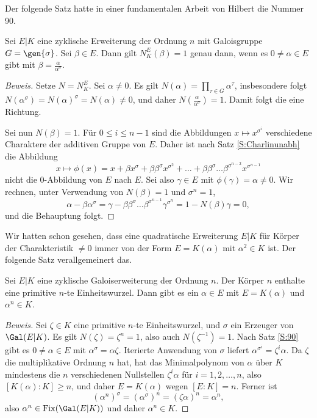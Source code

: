 \documentclass[12pt,a4paper,twoside]{article}
\DeclareMathOperator{\Fix}{Fix}
\begin{document}
Der folgende Satz hatte in einer fundamentalen Arbeit von Hilbert die Nummer
90.
\begin{Satz}\label{S:90}
  Sei $E|K$ eine zyklische Erweiterung der Ordnung $n$ mit Galoisgruppe
  $G=\gen{\sigma}$. Sei $\beta\in E$. Dann gilt $N_K^E(\beta)=1$ genau dann,
  wenn es $0\ne\alpha\in E$ gibt mit $\beta=\frac{\alpha}{\alpha^\sigma}$.
\end{Satz}
\begin{proof}[Beweis]
  Setze $N=N_K^E$. Sei $\alpha\ne0$. Es gilt $N(\alpha)=\prod_{\tau\in
    G}\alpha^\tau$, insbesondere folgt
  $N(\alpha^\sigma)=N(\alpha)^\sigma=N(\alpha)\ne0$, und daher
  $N(\frac{\alpha}{\alpha^\sigma})=1$. Damit folgt die eine Richtung.

Sei nun $N(\beta)=1$. F\"ur $0\le i\le n-1$ sind die Abbildungen $x\mapsto
x^{\sigma^i}$ verschiedene Charaktere der additiven Gruppe von $E$. Daher ist
nach Satz \ref{S:Charlinunabh} die Abbildung
\[
x\mapsto \phi(x)=x+\beta x^\sigma+\beta\beta^\sigma x^{\sigma^2}+\dots
+\beta\beta^\sigma\dots\beta^{\sigma^{n-2}}x^{\sigma^{n-1}}
\]
nicht die $0$-Abbildung von $E$ nach $E$. Sei also $\gamma\in E$ mit
$\phi(\gamma)=\alpha\ne0$. Wir rechnen, unter Verwendung von $N(\beta)=1$ und
$\sigma^n=1$,
\[
\alpha-\beta\alpha^\sigma=
\gamma-\beta\beta^\sigma\dots\beta^{\sigma^{n-1}}\gamma^{\sigma^{n}}=
1-N(\beta)\gamma=0,
\]
und die Behauptung folgt.

\end{proof}
Wir hatten schon gesehen, dass eine quadratische Erweiterung $E|K$ f\"ur
K\"orper der Charakteristik $\ne0$ immer von der Form $E=K(\alpha)$ mit
$\alpha^2\in K$ ist. Der folgende Satz verallgemeinert das.
\begin{Satz}\label{S:zykErw}
  Sei $E|K$ eine zyklische Galoiserweiterung der Ordnung $n$. Der K\"orper $n$
  enthalte eine primitive $n$-te Einheitswurzel. Dann gibt es ein $\alpha\in
  E$ mit $E=K(\alpha)$ und $\alpha^n\in K$.
\end{Satz}
\begin{proof}[Beweis]
  Sei $\zeta\in K$ eine primitive $n$-te Einheitswurzel, und $\sigma$ ein
  Erzeuger von $\Gal(E|K)$. Es gilt $N(\zeta)=\zeta^n=1$, also auch
  $N(\zeta^{-1})=1$. Nach Satz \ref{S:90} gibt es $0\ne\alpha\in E$ mit
  $\alpha^\sigma=\alpha\zeta$. Iterierte Anwendung von $\sigma$ liefert
  $\alpha^{\sigma^i}=\zeta^i\alpha$. Da $\zeta$ die multiplikative Ordnung $n$
  hat, hat das Minimalpolynom von $\alpha$ \"uber $K$ mindestens die $n$
  verschiedenen Nullstellen $\zeta^i\alpha$ f\"ur $i=1,2,\dots,n$, also
  $[K(\alpha):K]\ge n$, und daher $E=K(\alpha)$ wegen $[E:K]=n$. Ferner ist
\[
(\alpha^n)^\sigma=(\alpha^\sigma)^n=(\zeta\alpha)^n=\alpha^n,
\]
also $\alpha^n\in\Fix(\Gal(E|K))$ und daher $\alpha^n\in K$.
\end{proof}
\end{document}
